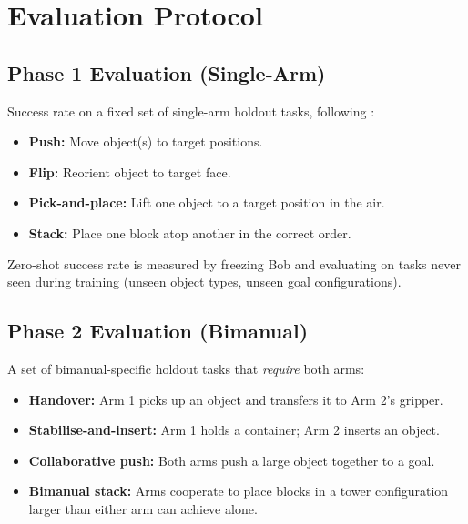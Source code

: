 \documentclass[12pt, a4paper]{article}
\begin{document}
\section{Evaluation Protocol}
\label{sec:eval}

\subsection{Phase 1 Evaluation (Single-Arm)}
\label{subsec:eval_phase1}

Success rate on a fixed set of single-arm holdout tasks, following
\citet{plappert2021asymmetric}:
\begin{itemize}[nosep]
    \item \textbf{Push:} Move object(s) to target positions.
    \item \textbf{Flip:} Reorient object to target face.
    \item \textbf{Pick-and-place:} Lift one object to a target position in the air.
    \item \textbf{Stack:} Place one block atop another in the correct order.
\end{itemize}
Zero-shot success rate is measured by freezing Bob and evaluating on tasks never seen
during training (unseen object types, unseen goal configurations).

\subsection{Phase 2 Evaluation (Bimanual)}
\label{subsec:eval_phase2}

A set of bimanual-specific holdout tasks that \emph{require} both arms:
\begin{itemize}[nosep]
    \item \textbf{Handover:} Arm 1 picks up an object and transfers it to Arm 2's gripper.
    \item \textbf{Stabilise-and-insert:} Arm 1 holds a container; Arm 2 inserts an object.
    \item \textbf{Collaborative push:} Both arms push a large object together to a goal.
    \item \textbf{Bimanual stack:} Arms cooperate to place blocks in a tower configuration
          larger than either arm can achieve alone.
\end{itemize}
\end{document}
